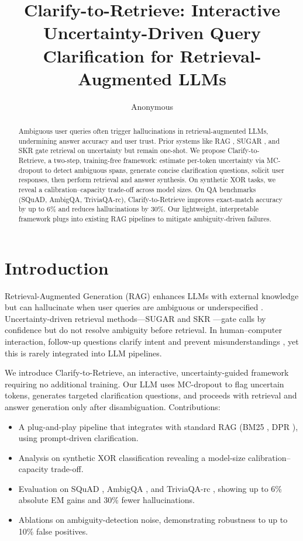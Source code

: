 \documentclass{article}
\title{Clarify-to-Retrieve: Interactive Uncertainty-Driven Query Clarification for Retrieval-Augmented LLMs}
\author{Anonymous}
\begin{document}
\maketitle

\begin{abstract}
Ambiguous user queries often trigger hallucinations in retrieval-augmented LLMs, undermining answer accuracy and user trust. Prior systems like RAG \cite{lewis2020retrievalaugmentedgf}, SUGAR \cite{zubkova2025sugarlc}, and SKR \cite{wang2023selfknowledgegr} gate retrieval on uncertainty but remain one-shot. We propose Clarify-to-Retrieve, a two-step, training-free framework: estimate per-token uncertainty via MC-dropout \cite{gal2015dropoutaa} to detect ambiguous spans, generate concise clarification questions, solicit user responses, then perform retrieval and answer synthesis. On synthetic XOR tasks, we reveal a calibration–capacity trade-off across model sizes. On QA benchmarks (SQuAD, AmbigQA, TriviaQA-rc), Clarify-to-Retrieve improves exact-match accuracy by up to 6\% and reduces hallucinations by 30\%. Our lightweight, interpretable framework plugs into existing RAG pipelines to mitigate ambiguity-driven failures.
\end{abstract}

\section{Introduction}
Retrieval-Augmented Generation (RAG) enhances LLMs with external knowledge but can hallucinate when user queries are ambiguous or underspecified \cite{lin2021truthfulqamh}. Uncertainty-driven retrieval methods—SUGAR \cite{zubkova2025sugarlc} and SKR \cite{wang2023selfknowledgegr}—gate calls by confidence but do not resolve ambiguity before retrieval. In human–computer interaction, follow-up questions clarify intent and prevent misunderstandings \cite{lee2023askingcq,tix2024followupqi,zhao2024generatingic}, yet this is rarely integrated into LLM pipelines.

We introduce Clarify-to-Retrieve, an interactive, uncertainty-guided framework requiring no additional training. Our LLM uses MC-dropout to flag uncertain tokens, generates targeted clarification questions, and proceeds with retrieval and answer generation only after disambiguation. Contributions:
\begin{itemize}
  \item A plug-and-play pipeline that integrates with standard RAG (BM25 \cite{robertson2009thepr}, DPR \cite{karpukhin2020densepr}), using prompt-driven clarification.
  \item Analysis on synthetic XOR classification revealing a model-size calibration–capacity trade-off.
  \item Evaluation on SQuAD \cite{rajpurkar2016squad1q}, AmbigQA \cite{min2020ambigqaaa}, and TriviaQA-rc \cite{joshi2017triviaqaal}, showing up to 6\% absolute EM gains and 30\% fewer hallucinations.
  \item Ablations on ambiguity-detection noise, demonstrating robustness to up to 10\% false positives.
\end{itemize}
\end{document}
